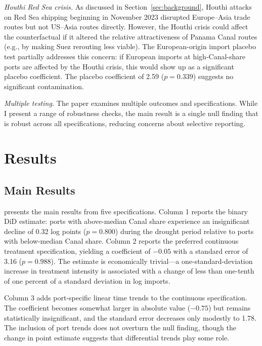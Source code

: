 \documentclass[12pt]{article}
\begin{document}
\textit{Houthi Red Sea crisis.} As discussed in Section~\ref{sec:background}, Houthi attacks on Red Sea shipping beginning in November 2023 disrupted Europe--Asia trade routes but not US--Asia routes directly. However, the Houthi crisis could affect the counterfactual if it altered the relative attractiveness of Panama Canal routes (e.g., by making Suez rerouting less viable). The European-origin import placebo test partially addresses this concern: if European imports at high-Canal-share ports are affected by the Houthi crisis, this would show up as a significant placebo coefficient. The placebo coefficient of 2.59 ($p = 0.339$) suggests no significant contamination.

\textit{Multiple testing.} The paper examines multiple outcomes and specifications. While I present a range of robustness checks, the main result is a single null finding that is robust across all specifications, reducing concerns about selective reporting.


\section{Results}
\label{sec:results}

\subsection{Main Results}

 presents the main results from five specifications. Column 1 reports the binary DiD estimate: ports with above-median Canal share experience an insignificant decline of 0.32 log points ($p = 0.800$) during the drought period relative to ports with below-median Canal share. Column 2 reports the preferred continuous treatment specification, yielding a coefficient of $-0.05$ with a standard error of 3.16 ($p = 0.988$). The estimate is economically trivial---a one-standard-deviation increase in treatment intensity is associated with a change of less than one-tenth of one percent of a standard deviation in log imports.

Column 3 adds port-specific linear time trends to the continuous specification. The coefficient becomes somewhat larger in absolute value ($-0.75$) but remains statistically insignificant, and the standard error decreases only modestly to 1.78. The inclusion of port trends does not overturn the null finding, though the change in point estimate suggests that differential trends play some role.
\end{document}
